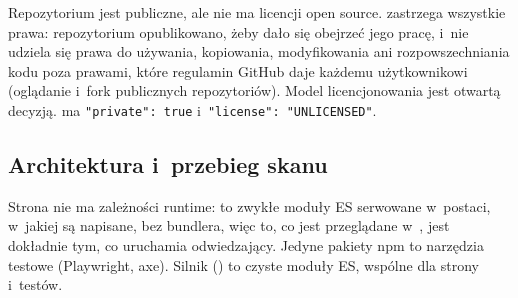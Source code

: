 Repozytorium jest publiczne, ale nie ma licencji open source.  zastrzega
wszystkie prawa: repozytorium opublikowano, żeby dało się obejrzeć jego pracę, i~nie
udziela się prawa do używania, kopiowania, modyfikowania ani rozpowszechniania kodu poza
prawami, które regulamin GitHub daje każdemu użytkownikowi (oglądanie i~fork publicznych
repozytoriów). Model licencjonowania jest otwartą decyzją.  ma
\texttt{"private": true} i~\texttt{"license": "UNLICENSED"}.


\subsection{Architektura i~przebieg skanu}\label{sec:risk-scan-architektura}

Strona nie ma zależności runtime: to zwykłe moduły ES serwowane w~postaci, w~jakiej są
napisane, bez bundlera, więc to, co jest przeglądane w~, jest dokładnie tym, co
uruchamia odwiedzający. Jedyne pakiety npm to narzędzia testowe (Playwright, axe). Silnik
() to czyste moduły ES, wspólne dla strony i~testów.

